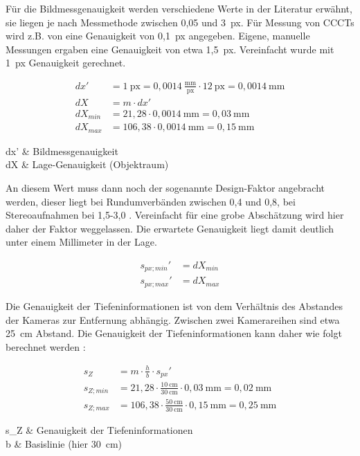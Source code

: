 \documentclass[./00PhotoBox.tex]{subfiles}
\begin{document}
Für die Bildmessgenauigkeit werden verschiedene Werte in der Literatur erwähnt, sie liegen je nach Messmethode zwischen 0,05 und 3~px. Für Messung von CCCTs wird z.B. von \cite{soot2015} eine Genauigkeit von 0,1~px angegeben.
Eigene, manuelle Messungen ergaben eine Genauigkeit von etwa 1,5~px. Vereinfacht wurde mit 1~px Genauigkeit gerechnet.

\begin{align}
    dx'      & = 1~\text{px} = 0,0014~\frac{\text{mm}}{\text{px}} \cdot 12~\text{px} = 0,0014~\text{mm} \\
    dX       & = m \cdot dx'                                                                            \\
    dX_{min} & = 21,28 \cdot 0,0014~\text{mm} = 0,03~\text{mm}                                          \\
    dX_{max} & = 106,38 \cdot 0,0014~\text{mm} = 0,15~\text{mm}
\end{align}
\begin{conditions}
    dx' & Bildmessgenauigkeit \\
    dX  & Lage-Genauigkeit (Objektraum)
\end{conditions}

An diesem Wert muss dann noch der sogenannte Design-Faktor  angebracht werden, dieser liegt bei Rundumverbänden zwischen 0,4 und 0,8, bei Stereoaufnahmen bei 1,5-3,0 \citep[S. 174]{luhmann}. Vereinfacht für eine grobe Abschätzung wird hier daher der Faktor weggelassen. Die erwartete Genauigkeit liegt damit deutlich unter einem Millimeter in der Lage.

\begin{align}
    s_{px; min}' & = dX_{min} \\
    s_{px; max}' & = dX_{max}
\end{align}

Die Genauigkeit der Tiefeninformationen ist von dem Verhältnis des Abstandes der Kameras zur Entfernung abhängig. Zwischen zwei Kamerareihen sind etwa 25~cm Abstand. Die Genauigkeit der Tiefeninformationen kann daher wie folgt berechnet werden \citep[S. 174]{luhmann}:

\begin{align}
    s_Z       & = m \cdot \frac{h}{b} \cdot s_{px}'                                                    \\
    s_{Z;min} & = 21,28 \cdot \frac{10~\text{cm}}{30~\text{cm}}\cdot 0,03~\text{mm}  = 0,02~\text{mm}  \\
    s_{Z;max} & = 106,38 \cdot \frac{50~\text{cm}}{30~\text{cm}} \cdot 0,15~\text{mm} = 0,25~\text{mm}
\end{align}
\begin{conditions}
    s_Z & Genauigkeit der Tiefeninformationen \\
    b   & Basislinie (hier 30~cm)
\end{conditions}
\end{document}

